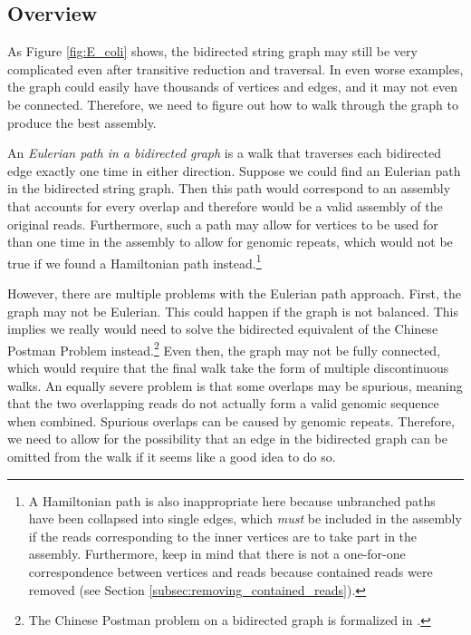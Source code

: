 \documentclass[12pt]{article}
\newcommand{\Figure}[1]{Figure \ref{#1}}
\newcommand{\Subsection}[1]{Section \ref{#1}}
\newcommand{\KeyTerm}[1]{{\it #1}}
\begin{document}
\label{sec:final}

\subsection{Overview}

As \Figure{fig:E_coli} shows, the bidirected string graph may still be very
complicated even after transitive reduction and traversal.  In even worse
examples, the graph could easily have thousands of vertices and edges, and it
may not even be connected.  Therefore, we need to figure out how to walk through
the graph to produce the best assembly.

An \KeyTerm{Eulerian path in a bidirected graph} is a walk that traverses each
bidirected edge exactly one time in either direction.  Suppose we could find an
Eulerian path in the bidirected string graph.  Then this path would correspond
to an assembly that accounts for every overlap and therefore would be a valid
assembly of the original reads.  Furthermore, such a path may allow for vertices
to be used for than one time in the assembly to allow for genomic repeats, which
would not be true if we found a Hamiltonian path instead.\footnote{A Hamiltonian
path is also inappropriate here because unbranched paths have been collapsed
into single edges, which {\em must} be included in the assembly if the reads
corresponding to the inner vertices are to take part in the assembly.
Furthermore, keep in mind that there is not a one-for-one correspondence between
vertices and reads because contained reads were removed (see
\Subsection{subsec:removing_contained_reads}).}

However, there are multiple problems with the Eulerian path approach.  First,
the graph may not be Eulerian.  This could happen if the graph is not balanced.
This implies we really would need to solve the bidirected equivalent of the
Chinese Postman Problem instead.\footnote{The Chinese Postman problem on a
bidirected graph is formalized in \cite{Medvedev2009}.}  Even then, the graph
may not be fully connected, which would require that the final walk take the
form of multiple discontinuous walks.  An equally severe problem is that some
overlaps may be spurious, meaning that the two overlapping reads do not actually
form a valid genomic sequence when combined.  Spurious overlaps can be caused by
genomic repeats.  Therefore, we need to allow for the possibility that an edge
in the bidirected graph can be omitted from the walk if it seems like a good
idea to do so.
\end{document}
